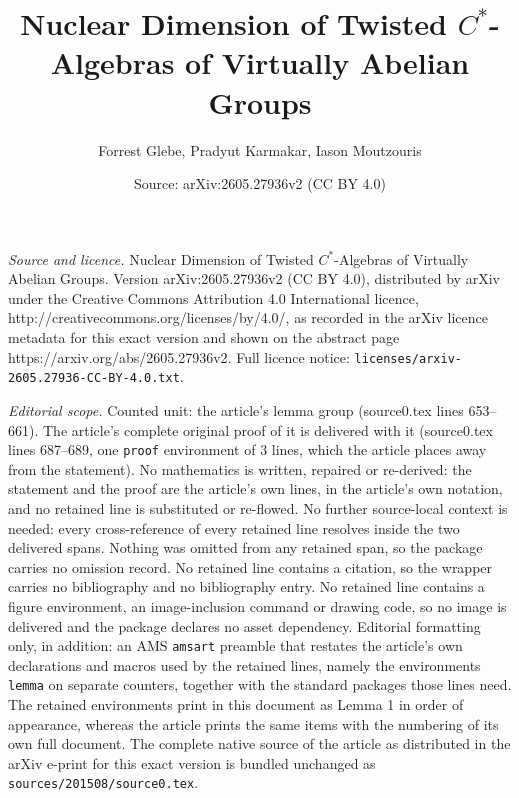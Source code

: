 \documentclass[10pt,a4paper]{amsart}
\title{Nuclear Dimension of Twisted $C^*$-Algebras of Virtually Abelian Groups}
\author{Forrest Glebe, Pradyut Karmakar, Iason Moutzouris}
\date{Source: arXiv:2605.27936v2 (CC BY 4.0)}
\begin{document}
\maketitle

\noindent\emph{Source and licence.} Nuclear Dimension of Twisted $C^*$-Algebras of Virtually Abelian Groups. Version arXiv:2605.27936v2 (CC BY 4.0), distributed by arXiv under the Creative Commons Attribution 4.0 International licence, http://creativecommons.org/licenses/by/4.0/, as recorded in the arXiv licence metadata for this exact version and shown on the abstract page https://arxiv.org/abs/2605.27936v2. Full licence notice: \texttt{licenses/arxiv-2605.27936-CC-BY-4.0.txt}.\par\smallskip

\noindent\textit{Editorial scope.} Counted unit: the article's lemma group (source0.tex lines 653--661). The article's complete original proof of it is delivered with it (source0.tex lines 687--689, one \texttt{proof} environment of 3 lines, which the article places away from the statement). No mathematics is written, repaired or re-derived: the statement and the proof are the article's own lines, in the article's own notation, and no retained line is substituted or re-flowed.  No further source-local context is needed: every cross-reference of every retained line resolves inside the two delivered spans.  Nothing was omitted from any retained span, so the package carries no omission record.  No retained line contains a citation, so the wrapper carries no bibliography and no bibliography entry.  No retained line contains a figure environment, an image-inclusion command or drawing code, so no image is delivered and the package declares no asset dependency.  Editorial formatting only, in addition: an AMS \texttt{amsart} preamble that restates the article's own declarations and macros used by the retained lines, namely the environments \texttt{lemma} on separate counters, together with the standard packages those lines need.  The retained environments print in this document as Lemma 1 in order of appearance, whereas the article prints the same items with the numbering of its own full document.  The complete native source of the article as distributed in the arXiv e-print for this exact version is bundled unchanged as \texttt{sources/201508/source0.tex}.
\end{document}
